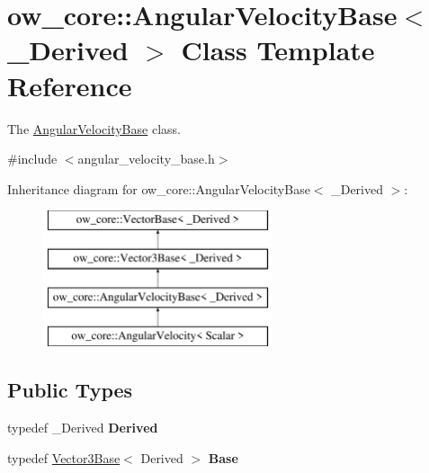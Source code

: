 \hypertarget{classow__core_1_1AngularVelocityBase}{}\section{ow\+\_\+core\+:\+:Angular\+Velocity\+Base$<$ \+\_\+\+Derived $>$ Class Template Reference}
\label{classow__core_1_1AngularVelocityBase}


The \hyperlink{classow__core_1_1AngularVelocityBase}{Angular\+Velocity\+Base} class.  




{\ttfamily \#include $<$angular\+\_\+velocity\+\_\+base.\+h$>$}

Inheritance diagram for ow\+\_\+core\+:\+:Angular\+Velocity\+Base$<$ \+\_\+\+Derived $>$\+:\begin{figure}[H]
\begin{center}
\leavevmode
\includegraphics[height=4.000000cm]{da/d05/classow__core_1_1AngularVelocityBase}
\end{center}
\end{figure}
\subsection*{Public Types}
\begin{DoxyCompactItemize}
\item 
typedef \+\_\+\+Derived {\bfseries Derived}\hypertarget{classow__core_1_1AngularVelocityBase_a9b224c714a5e32f44281e46e56749f5e}{}\label{classow__core_1_1AngularVelocityBase_a9b224c714a5e32f44281e46e56749f5e}

\item 
typedef \hyperlink{classow__core_1_1Vector3Base}{Vector3\+Base}$<$ Derived $>$ {\bfseries Base}\hypertarget{classow__core_1_1AngularVelocityBase_a580212a452f9ee3868acdb0557ae4a81}{}\label{classow__core_1_1AngularVelocityBase_a580212a452f9ee3868acdb0557ae4a81}

\end{DoxyCompactItemize}

